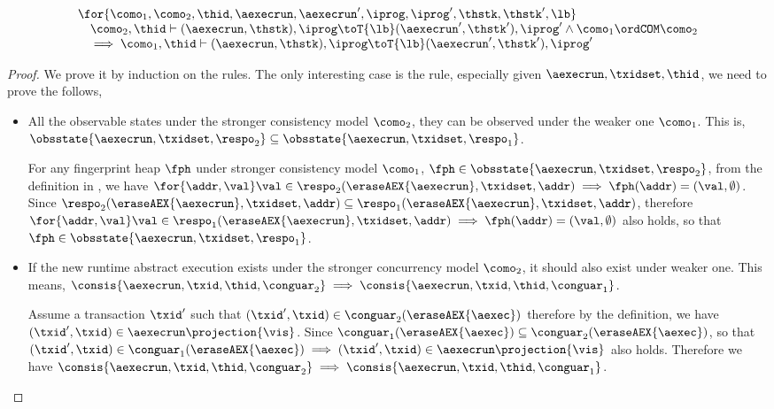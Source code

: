 \begin{lem}
\[
\begin{array}{@{}l@{}}
    \for{\como_{1}, \como_{2}, \thid, \aexecrun, \aexecrun', \iprog, \iprog', \thstk, \thstk', \lb}  \\
    \quad \como_{2}, \thid \vdash ( \aexecrun, \thstk ), \iprog \toT{\lb} ( \aexecrun', \thstk' ), \iprog'
    \land \como_{1} \ordCOM \como_{2} \\
    \quad \implies \como_{1}, \thid \vdash ( \aexecrun, \thstk ), \iprog \toT{\lb} ( \aexecrun', \thstk' ), \iprog'
\end{array}
\]
\end{lem}
\begin{proof}
We prove it by induction on the rules.
The only interesting case is the   rule, especially given \( \aexecrun, \txidset, \thid \), we need to prove the follows,
\begin{itemize}
\item All the observable states under the stronger consistency model \( \como_{2} \), they can be observed under the weaker one \( \como_{1} \).
This is, \( \obsstate{\aexecrun, \txidset, \respo_{2}} \subseteq  \obsstate{\aexecrun, \txidset, \respo_{1}} \).

For any fingerprint heap \( \fph \) under stronger consistency model \( \como_{1}\), \ie \( \fph \in \obsstate{\aexecrun, \txidset, \respo_{2}} \), from the definition in , we have \( \for{\addr, \val}  \val \in \respo_{2}(\eraseAEX{\aexecrun}, \txidset, \addr) \implies \fph(\addr) = (\val, \emptyset) \).
Since \( \respo_{2}(\eraseAEX{\aexecrun}, \txidset, \addr) \subseteq \respo_{1}(\eraseAEX{\aexecrun}, \txidset, \addr) \), therefore \( \for{\addr, \val}  \val \in \respo_{1}(\eraseAEX{\aexecrun}, \txidset, \addr) \implies \fph(\addr) = (\val, \emptyset) \) also holds, so that \( \fph \in \obsstate{\aexecrun, \txidset, \respo_{1}} \).

\item If the new runtime abstract execution exists under the stronger concurrency model \( \como_{2} \), it should also exist under weaker one.
This means, \( \consis{\aexecrun, \txid, \thid, \conguar_{2}} \implies \consis{\aexecrun, \txid, \thid, \conguar_{1}} \).

Assume a transaction \( \txid' \) such that \( (\txid', \txid) \in \conguar_{2}(\eraseAEX{\aexec}) \) therefore by the definition, we have \( (\txid', \txid) \in \aexecrun\projection{\vis} \).
Since \( \conguar_{1}(\eraseAEX{\aexec}) \subseteq \conguar_{2}(\eraseAEX{\aexec})\), so that \( (\txid', \txid) \in \conguar_{1}(\eraseAEX{\aexec}) \implies (\txid', \txid) \in \aexecrun\projection{\vis} \) also holds.
Therefore we have \( \consis{\aexecrun, \txid, \thid, \conguar_{2}} \implies \consis{\aexecrun, \txid, \thid, \conguar_{1}} \).
\end{itemize}
\end{proof}


